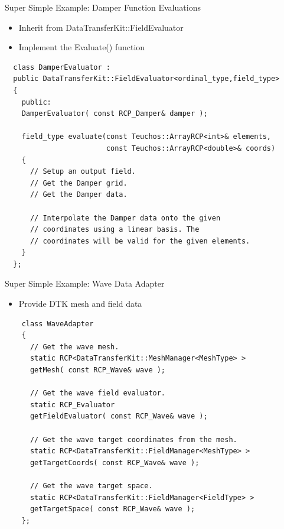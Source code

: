 \documentclass{beamer}
\begin{document}
\begin{frame}[fragile]{Super Simple Example: Damper Function Evaluations}

  \begin{itemize}
  \item Inherit from DataTransferKit::FieldEvaluator
  \item Implement the Evaluate() function
  \end{itemize}
 
  \begin{lstlisting}
  class DamperEvaluator : 
  public DataTransferKit::FieldEvaluator<ordinal_type,field_type>
  {
    public:
    DamperEvaluator( const RCP_Damper& damper );

    field_type evaluate(const Teuchos::ArrayRCP<int>& elements,
                        const Teuchos::ArrayRCP<double>& coords)
    {
      // Setup an output field.
      // Get the Damper grid.
      // Get the Damper data.

      // Interpolate the Damper data onto the given 
      // coordinates using a linear basis. The 
      // coordinates will be valid for the given elements.
    }
  };
  \end{lstlisting}

\end{frame}

\begin{frame}[fragile]{Super Simple Example: Wave Data Adapter}

  \begin{itemize}
  \item Provide DTK mesh and field data
  \end{itemize}
  
  \begin{lstlisting}
    class WaveAdapter
    {
      // Get the wave mesh.
      static RCP<DataTransferKit::MeshManager<MeshType> >
      getMesh( const RCP_Wave& wave );

      // Get the wave field evaluator.
      static RCP_Evaluator 
      getFieldEvaluator( const RCP_Wave& wave );

      // Get the wave target coordinates from the mesh.
      static RCP<DataTransferKit::FieldManager<MeshType> >
      getTargetCoords( const RCP_Wave& wave );

      // Get the wave target space.
      static RCP<DataTransferKit::FieldManager<FieldType> >
      getTargetSpace( const RCP_Wave& wave );
    };
  \end{lstlisting}

\end{frame}
\end{document}
